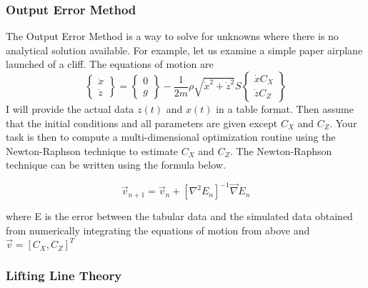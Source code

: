 \subsubsection{Output Error Method}

The Output Error Method is a way to solve for unknowns where there is
no analytical solution available. For example, let us examine a simple
paper airplane launched of a cliff. The equations of motion are
\begin{equation}\nonumber
\begin{Bmatrix}
\ddot{x} \\ \ddot{z} 
\end{Bmatrix}
= 
\begin{Bmatrix} 0 \\ g \end{Bmatrix} - \frac{1}{2m}\rho\sqrt{\dot{x}^2+\dot{z}^2}S \begin{Bmatrix} \dot{x}C_X
  \\ \dot{z}C_Z \end{Bmatrix}
\end{equation}
I will provide the actual data $z(t)$ and $x(t)$ in a table format. Then assume that
the initial conditions and all parameters are given except $C_X$ and
$C_Z$. Your task is then to compute a multi-dimensional optimization
routine using the Newton-Raphson technique to estimate $C_X$ and
$C_Z$. The Newton-Raphson technique can be written using the formula
below.

\begin{equation}
\vec{v}_{n+1} = \vec{v}_n + [\nabla^2 E_n]^{-1}\vec{\nabla} E_n
\end{equation}

\noindent where E is the error between the tabular data and the
simulated data obtained from numerically integrating the equations of
motion from above and $\vec{v} = [C_X,C_Z]^T$

\subsubsection{Lifting Line Theory}

